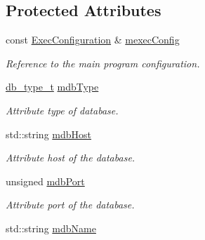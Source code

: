 \subsection*{Protected Attributes}
\begin{DoxyCompactItemize}
\item 
\hypertarget{classDbConfiguration_aec42c79cc0d155ffc54ddfa8ee9daecd}{
const \hyperlink{classExecConfiguration}{ExecConfiguration} \& \hyperlink{classDbConfiguration_aec42c79cc0d155ffc54ddfa8ee9daecd}{mexecConfig}}
\label{classDbConfiguration_aec42c79cc0d155ffc54ddfa8ee9daecd}

\begin{DoxyCompactList}\small\item\em Reference to the main program configuration. \item\end{DoxyCompactList}\item 
\hypertarget{classDbConfiguration_a702c7cf89e77b3fd6ececcd51734c5b6}{
\hyperlink{classDbConfiguration_a4a57e43a5017a5c4833a784a994c91cf}{db\_\-type\_\-t} \hyperlink{classDbConfiguration_a702c7cf89e77b3fd6ececcd51734c5b6}{mdbType}}
\label{classDbConfiguration_a702c7cf89e77b3fd6ececcd51734c5b6}

\begin{DoxyCompactList}\small\item\em Attribute type of database. \item\end{DoxyCompactList}\item 
\hypertarget{classDbConfiguration_a99de17b15f3b8fa9e7ed76f564cbeaf0}{
std::string \hyperlink{classDbConfiguration_a99de17b15f3b8fa9e7ed76f564cbeaf0}{mdbHost}}
\label{classDbConfiguration_a99de17b15f3b8fa9e7ed76f564cbeaf0}

\begin{DoxyCompactList}\small\item\em Attribute host of the database. \item\end{DoxyCompactList}\item 
\hypertarget{classDbConfiguration_a156df53ac791e9b01a62d04a2e57926b}{
unsigned \hyperlink{classDbConfiguration_a156df53ac791e9b01a62d04a2e57926b}{mdbPort}}
\label{classDbConfiguration_a156df53ac791e9b01a62d04a2e57926b}

\begin{DoxyCompactList}\small\item\em Attribute port of the database. \item\end{DoxyCompactList}\item 
\hypertarget{classDbConfiguration_aeb3141eddb0bdb0081dee5e23ae9a29a}{
std::string \hyperlink{classDbConfiguration_aeb3141eddb0bdb0081dee5e23ae9a29a}{mdbName}}
\label{classDbConfiguration_aeb3141eddb0bdb0081dee5e23ae9a29a}


\end{DoxyCompactItemize}
